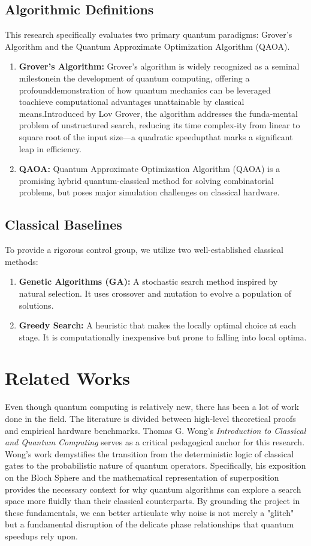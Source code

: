 \documentclass[12pt]{article}
\begin{document}
\subsection{Algorithmic Definitions}
This research specifically evaluates two primary quantum paradigms: Grover’s Algorithm and the Quantum Approximate Optimization Algorithm (QAOA). 
\begin{enumerate}
    \item \textbf{Grover’s Algorithm:} Grover’s algorithm is widely recognized as a seminal milestonein the development of quantum computing, offering a profounddemonstration of how quantum mechanics can be leveraged toachieve computational advantages unattainable by classical means.Introduced by Lov Grover, the algorithm addresses the funda-mental problem of unstructured search, reducing its time complex-ity from linear to square root of the input size—a quadratic speedupthat marks a significant leap in efficiency. \cite{faro}
    \item \textbf{QAOA:} Quantum Approximate Optimization Algorithm (QAOA) is a promising hybrid quantum-classical method for solving combinatorial problems, but poses major simulation challenges on classical hardware. \cite{chiu}
\end{enumerate}

\subsection{Classical Baselines}
To provide a rigorous control group, we utilize two well-established classical methods:
\begin{enumerate}
    \item \textbf{Genetic Algorithms (GA):} A stochastic search method inspired by natural selection. It uses crossover and mutation to evolve a population of solutions.
    \item \textbf{Greedy Search:} A heuristic that makes the locally optimal choice at each stage. It is computationally inexpensive but prone to falling into local optima.
\end{enumerate}

\section{Related Works}
Even though quantum computing is relatively new, there has been a lot of work done in the field. The literature is divided between high-level theoretical proofs and empirical hardware benchmarks. Thomas G. Wong’s \textit{Introduction to Classical and Quantum Computing} \cite{wong2019} serves as a critical pedagogical anchor for this research. Wong’s work demystifies the transition from the deterministic logic of classical gates to the probabilistic nature of quantum operators. Specifically, his exposition on the Bloch Sphere and the mathematical representation of superposition provides the necessary context for why quantum algorithms can explore a search space more fluidly than their classical counterparts. By grounding the project in these fundamentals, we can better articulate why noise is not merely a "glitch" but a fundamental disruption of the delicate phase relationships that quantum speedups rely upon.
\end{document}
